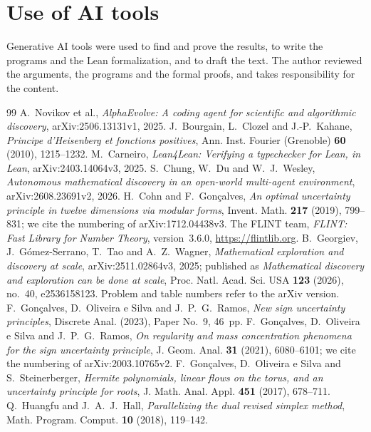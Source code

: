 \documentclass[11pt]{amsart}
\theoremstyle{definition}
\theoremstyle{remark}
\numberwithin{equation}{section}
\begin{document}
\section*{Use of AI tools}
Generative AI tools were used to find and prove the results, to write the programs and the Lean formalization, and to draft the text. The author reviewed the arguments, the programs and the formal proofs, and takes responsibility for the content.

\begin{thebibliography}{99}
 A.~Novikov et al., \emph{AlphaEvolve: A coding agent for scientific and algorithmic discovery}, arXiv:2506.13131v1, 2025.
 J.~Bourgain, L.~Clozel and J.-P.~Kahane, \emph{Principe d'Heisenberg et fonctions positives}, Ann. Inst. Fourier (Grenoble) \textbf{60} (2010), 1215--1232.
 M.~Carneiro, \emph{Lean4Lean: Verifying a typechecker for Lean, in Lean}, arXiv:2403.14064v3, 2025.
 S.~Chung, W.~Du and W.~J.~Wesley, \emph{Autonomous mathematical discovery in an open-world multi-agent environment}, arXiv:2608.23691v2, 2026.
 H.~Cohn and F.~Gon\c{c}alves, \emph{An optimal uncertainty principle in twelve dimensions via modular forms}, Invent. Math. \textbf{217} (2019), 799--831; we cite the numbering of arXiv:1712.04438v3.
 The FLINT team, \emph{FLINT: Fast Library for Number Theory}, version~3.6.0, \url{https://flintlib.org}.
 B.~Georgiev, J.~G\'omez-Serrano, T.~Tao and A.~Z.~Wagner, \emph{Mathematical exploration and discovery at scale}, arXiv:2511.02864v3, 2025; published as \emph{Mathematical discovery and exploration can be done at scale}, Proc. Natl. Acad. Sci. USA \textbf{123} (2026), no.~40, e2536158123. Problem and table numbers refer to the arXiv version.
 F.~Gon\c{c}alves, D.~Oliveira e Silva and J.~P.~G.~Ramos, \emph{New sign uncertainty principles}, Discrete Anal. (2023), Paper No.~9, 46~pp.
 F.~Gon\c{c}alves, D.~Oliveira e Silva and J.~P.~G.~Ramos, \emph{On regularity and mass concentration phenomena for the sign uncertainty principle}, J. Geom. Anal. \textbf{31} (2021), 6080--6101; we cite the numbering of arXiv:2003.10765v2.
 F.~Gon\c{c}alves, D.~Oliveira e Silva and S.~Steinerberger, \emph{Hermite polynomials, linear flows on the torus, and an uncertainty principle for roots}, J. Math. Anal. Appl. \textbf{451} (2017), 678--711.
 Q.~Huangfu and J.~A.~J.~Hall, \emph{Parallelizing the dual revised simplex method}, Math. Program. Comput. \textbf{10} (2018), 119--142.

\end{thebibliography}
\end{document}
